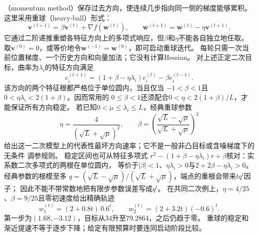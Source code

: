 （momentum method）保存过去方向，使连续几步指向同一侧的梯度能够累积。
这里采用重球（heavy-ball）形式：
\[
  \bm{v}^{(t+1)}=\beta\bm{v}^{(t)}+\nabla f(\bm{w}^{(t)}),
  \qquad
  \bm{w}^{(t+1)}=\bm{w}^{(t)}-\eta\bm{v}^{(t+1)}.
\]
它通过二阶递推重塑各特征方向上的多项式响应，但$\beta$和$\eta$不能各自独立地任取。
取$\bm v^{(0)}=0$，或等价地令$\bm w^{(-1)}=\bm w^{(0)}$，即可启动重球迭代。
每轮只需一次当前位置梯度、一个历史方向和向量加法；它没有计算Hessian。
对上述正定二次目标，曲率为$\lambda_i$的特征方向满足
\[
  e_i^{(t+1)}
  =(1+\beta-\eta\lambda_i)e_i^{(t)}-\beta e_i^{(t-1)}.
\]
该方向的两个特征根都严格位于单位圆内，当且仅当
$-1<\beta<1$且$0<\eta\lambda_i<2(1+\beta)$。因而常用的
$0\leq\beta<1$还须配合$0<\eta<2(1+\beta)/L$，才能保证所有方向稳定。
若已知$0<\mu\leq\lambda_i\leq L$，经典重球参数
\[
  \eta=\frac{4}{(\sqrt{L}+\sqrt{\mu})^2},
  \qquad
  \beta=\left(\frac{\sqrt{L}-\sqrt{\mu}}
  {\sqrt{L}+\sqrt{\mu}}\right)^2
\]
给出这一二次模型上的代表性最坏方向速率；它不是一般非凸目标或含噪梯度下的无条件
调参规则。
稳定区间也可从特征多项式
$r^2-(1+\beta-\eta\lambda_i)r+\beta$核对：实系数二次多项式的两根在单位圆内，
等价于$|\beta|<1$、$\eta\lambda_i>0$与$2+2\beta-\eta\lambda_i>0$。
经典参数的根模至多
$q=(\sqrt L-\sqrt\mu)/(\sqrt L+\sqrt\mu)$，端点的重根会带来$tq^t$因子；
因此不能不带常数地把有限步参数误差写成$q^t$。
在共同二次例上，$\eta=4/25$、$\beta=9/25$且零初速度给出精确轨迹
\[
 w_1^{(t)}=(2+0.8t)\,0.6^t,\qquad
 w_2^{(t)}=(2+3.2t)(-0.6)^t.
\]
第一步为$(1.68,-3.12)$，目标从$34$升至$79.2864$，之后仍趋于零。
重球的稳定和渐近提速不等于逐步下降；给定有限预算时要连同启动阶段比较。

